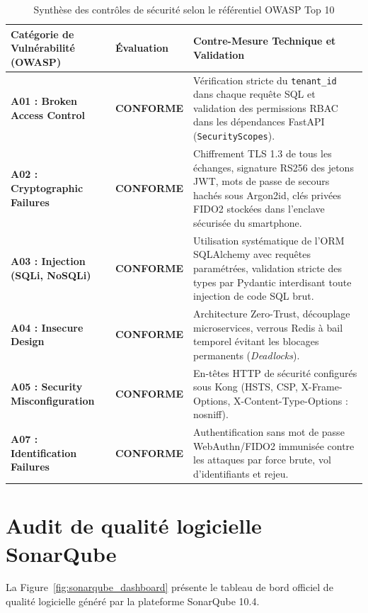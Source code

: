 \documentclass[12pt,a4paper,oneside]{report}
\begin{document}
\begin{table}[H]
\centering
\small
\renewcommand{\arraystretch}{1.3}
\begin{tabularx}{\textwidth}{|p{4.2cm}|p{2cm}|X|}
\hline
\textbf{Catégorie de Vulnérabilité (OWASP)} & \textbf{Évaluation} & \textbf{Contre-Mesure Technique et Validation} \\
\hline
\textbf{A01 : Broken Access Control} & \textbf{CONFORME} & Vérification stricte du \texttt{tenant\_id} dans chaque requête SQL et validation des permissions RBAC dans les dépendances FastAPI (\texttt{SecurityScopes}). \\
\hline
\textbf{A02 : Cryptographic Failures} & \textbf{CONFORME} & Chiffrement TLS 1.3 de tous les échanges, signature RS256 des jetons JWT, mots de passe de secours hachés sous Argon2id, clés privées FIDO2 stockées dans l'enclave sécurisée du smartphone. \\
\hline
\textbf{A03 : Injection (SQLi, NoSQLi)} & \textbf{CONFORME} & Utilisation systématique de l'ORM SQLAlchemy avec requêtes paramétrées, validation stricte des types par Pydantic interdisant toute injection de code SQL brut. \\
\hline
\textbf{A04 : Insecure Design} & \textbf{CONFORME} & Architecture Zero-Trust, découplage microservices, verrous Redis à bail temporel évitant les blocages permanents (\textit{Deadlocks}). \\
\hline
\textbf{A05 : Security Misconfiguration} & \textbf{CONFORME} & En-têtes HTTP de sécurité configurés sous Kong (HSTS, CSP, X-Frame-Options, X-Content-Type-Options : nosniff). \\
\hline
\textbf{A07 : Identification Failures} & \textbf{CONFORME} & Authentification sans mot de passe WebAuthn/FIDO2 immunisée contre les attaques par force brute, vol d'identifiants et rejeu. \\
\hline
\end{tabularx}
\caption{Synthèse des contrôles de sécurité selon le référentiel OWASP Top 10}
\label{tab:securite_owasp_detail}
\end{table}

\section{Audit de qualité logicielle SonarQube}

La Figure~\ref{fig:sonarqube_dashboard} présente le tableau de bord officiel de qualité logicielle généré par la plateforme SonarQube 10.4.
\end{document}
